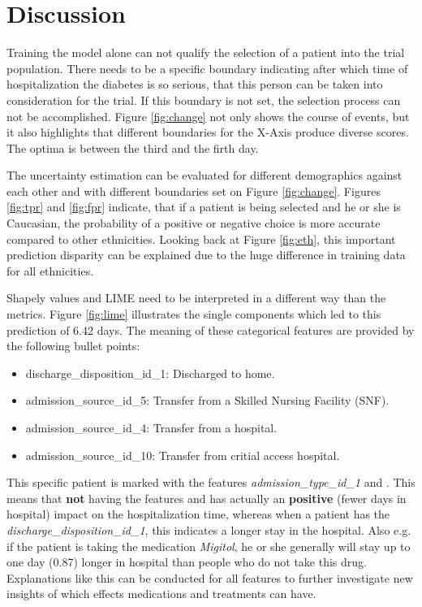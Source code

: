 \documentclass[journal]{IEEEtran}
\begin{document}
%
%
\section{Discussion}
Training the model alone can not qualify the selection of a patient into the trial population. There needs to be a specific boundary indicating after which time of hospitalization the diabetes is so serious, that this person can be taken into consideration for the trial. If this boundary is not set, the selection process can not be accomplished. Figure \ref{fig:change} not only shows the course of events, but it also highlights that different boundaries for the X-Axis produce diverse scores. The optima is between the third and the firth day. 

The uncertainty estimation can be evaluated for different demographics against each other and with different boundaries set on Figure \ref{fig:change}. Figures \ref{fig:tpr} and \ref{fig:fpr} indicate, that if a patient is being selected and he or she is Caucasian, the probability of a positive or negative choice is more accurate compared to other ethnicities. Looking back at Figure \ref{fig:eth}, this important prediction disparity can be explained due to the huge difference in training data for all ethnicities.

Shapely values and LIME need to be interpreted in a different way than the metrics. Figure \ref{fig:lime} illustrates the single components which led to this prediction of 6.42 days. The meaning of these categorical features are provided by the following bullet points: \\

\begin{itemize}
	\item discharge\_disposition\_id\_1: Discharged to home.
	\item admission\_source\_id\_5: Transfer from a Skilled Nursing Facility (SNF).
	\item admission\_source\_id\_4: Transfer from a hospital.
	\item admission\_source\_id\_10: Transfer from critial access hospital. \\
\end{itemize}

This specific patient is marked with the features \textit{admission\_type\_id\_1} and . This means that \textbf{not} having the features  and  has actually an \textbf{positive} (fewer days in hospital) impact on the hospitalization time, whereas when a patient has the \textit{discharge\_disposition\_id\_1}, this indicates a longer stay in the hospital. Also e.g. if the patient is taking the medication \textit{Migitol}, he or she generally will stay up to one day (0.87) longer in hospital than people who do not take this drug. Explanations like this can be conducted for all features to further investigate new insights of which effects medications and treatments can have.
\end{document}
